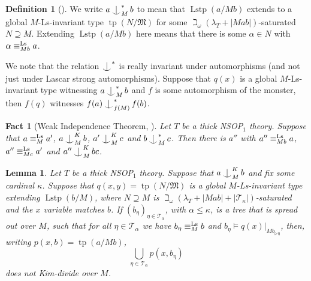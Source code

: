 \documentclass[a4paper, reqno]{amsart}
\newtheorem{lemma}[theorem]{Lemma}
\newtheorem{fact}[theorem]{Fact}
\theoremstyle{definition}
\newtheorem{definition}[theorem]{Definition}
\theoremstyle{repeat}
\newcommand{\MM}{\mathfrak{M}}
\newcommand{\T}{\mathcal{T}}
\DeclareMathOperator{\tp}{tp}
\DeclareMathOperator{\Lstp}{Lstp}
\newcommand{\equivls}{\equiv^\textup{Ls}}
\def\Ind#1#2{#1\setbox0=\hbox{$#1x$}\kern\wd0\hbox to 0pt{\hss$#1\mid$\hss}
\lower.9\ht0\hbox to 0pt{\hss$#1\smile$\hss}\kern\wd0}
\def\ind{\mathop{\mathpalette\Ind{}}}
\begin{document}
\begin{definition}[{\cite[Definition 7.3]{dobrowolski_kim-independence_2022}}]
We write $a \ind^*_M b$ to mean that $\Lstp(a/Mb)$ extends to a global $M$-Ls-invariant type $\tp(N/\MM)$ for some $\beth_\omega(\lambda_T + |Mab|)$-saturated $N \supseteq M$. Extending $\Lstp(a/Mb)$ here means that there is some $\alpha \in N$ with $\alpha \equivls_{Mb} a$.
\end{definition}
We note that the relation $\ind^*$ is really invariant under automorphisms (and not just under Lascar strong automorphisms). Suppose that $q(x)$ is a global $M$-Ls-invariant type witnessing $a \ind^*_M b$ and $f$ is some automorphism of the monster, then $f(q)$ witnesses $f(a) \ind^*_{f(M)} f(b)$.
\begin{fact}[Weak Independence Theorem, {\cite[Proposition 7.5]{dobrowolski_kim-independence_2022}}]
Let $T$ be a thick NSOP$_1$ theory. Suppose that $a \equivls_M a'$, $a \ind^K_M b$, $a' \ind^K_M c$ and $b \ind^*_M c$. Then there is $a''$ with $a'' \equivls_{Mb} a$, $a'' \equivls_{Mc} a'$ and $a'' \ind^K_M bc$.
\end{fact}
\begin{lemma}
Let $T$ be a thick NSOP$_1$ theory. Suppose that $a \ind^K_M b$ and fix some cardinal $\kappa$. Suppose that $q(x, y) = \tp(N/\MM)$ is a global $M$-Ls-invariant type extending $\Lstp(b/M)$, where $N \supseteq M$ is $\beth_\omega(\lambda_T + |Mab| + |\T_\kappa|)$-saturated and the $x$ variable matches $b$. If $(b_\eta)_{\eta \in \T_\alpha}$, with $\alpha \leq \kappa$, is a tree that is spread out over $M$, such that for all $\eta \in \T_\alpha$ we have $b_\eta \equivls_M b$ and $b_\eta \models q(x)|_{M b_{\rhd \eta}}$, then, writing $p(x, b) = \tp(a/Mb)$,
\[
\bigcup_{\eta \in \T_\alpha} p(x, b_\eta)
\]
does not Kim-divide over $M$.
\end{lemma}
\end{document}
